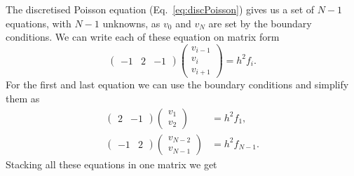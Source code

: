 \documentclass[english,notitlepage,aps,pra,10pt]{revtex4-2}
\begin{document}
The discretised Poisson equation (Eq.~\ref{eq:discPoisson}) gives us a set of $N-1$ equations, with $N-1$ unknowns, as $v_0$ and $v_N$ are set by the boundary conditions. We can write each of these equation on matrix form
\begin{equation}
    \begin{pmatrix}
        -1 & 2 & -1
    \end{pmatrix}
    \begin{pmatrix}
        v_{i-1} \\
        v_i \\
        v_{i+1}
    \end{pmatrix}
    = h^2 f_i.
\end{equation} 
For the first and last equation we can use the boundary conditions and simplify them as  
\begin{equation}
    \begin{split}
        \begin{pmatrix}
            2 & -1
        \end{pmatrix}
        \begin{pmatrix}
            v_1 \\
            v_2
        \end{pmatrix}
        &= h^2 f_1, \\
        \begin{pmatrix}
            -1 & 2
        \end{pmatrix}
        \begin{pmatrix}
            v_{N-2} \\
            v_{N-1}
        \end{pmatrix}
        &= h^2 f_{N-1}.
    \end{split}
\end{equation}
Stacking all these equations in one matrix we get 
\end{document}
